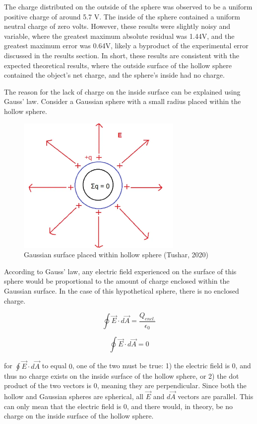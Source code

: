 The charge distributed on the outside of the sphere was observed to be a uniform positive charge of around 5.7 V. The inside of the sphere contained a uniform neutral charge of zero volts. However, these results were slightly noisy and variable, where the greatest maximum absolute residual was 1.44V, and the greatest maximum error was 0.64V, likely a byproduct of the experimental error discussed in the results section. In short, these results are consistent with the expected theoretical results, where the outside surface of the hollow sphere contained the object's net charge, and the sphere's inside had no charge.

The reason for the lack of charge on the inside surface can be explained using Gauss' law. Consider a Gaussian sphere with a small radius placed within the hollow sphere. 

\begin{figure}[h]
    \centering
    \includegraphics[height=250px]{photos/hollowtheory.png}
    \caption{Gaussian surface placed within hollow sphere (Tushar, 2020)}
    \label{fig:gaussiansurface}
\end{figure}
According to Gauss' law, any electric field experienced on the surface of this sphere would be proportional to the amount of charge enclosed within the Gaussian surface. In the case of this hypothetical sphere, there is no enclosed charge. 

$$\oint \vec{E} \cdot d\vec{A} = \frac{Q_{encl.}}{\epsilon_{0}}$$

$$\oint \vec{E} \cdot d\vec{A} = 0$$

for $\oint \vec{E} \cdot d\vec{A}$ to equal $0$, one of the two must be true:
1) the electric field is 0, and thus no charge exists on the inside surface of the hollow sphere, or
2) the dot product of the two vectors is $0$, meaning they are perpendicular.
Since both the hollow and Gaussian spheres are spherical, all $\vec{E}$ and $d\vec{A}$ vectors are parallel. This can only mean that the electric field is 0, and there would, in theory, be no charge on the inside surface of the hollow sphere.


\newpage
